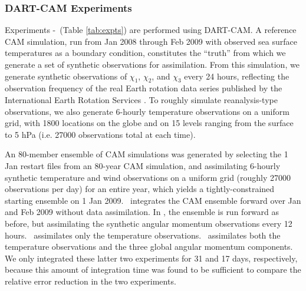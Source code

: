 

\subsubsection{DART-CAM Experiments}
Experiments \NODA-\ERPRST ~(Table \ref{tab:expts}) are performed using DART-CAM.  
A reference CAM simulation, run from Jan 2008 through Feb 2009 with observed sea surface temperatures as a boundary condition, constitutes the ``truth'' from which we generate a set of synthetic observations for assimilation. 
From this simulation, we generate synthetic observations of $\chi_1$, $\chi_2$, and $\chi_3$ every 24 hours, reflecting the observation frequency of the real Earth rotation data series published by the International Earth Rotation Services \citep{iers}.  
To roughly simulate reanalysis-type observations, we also generate 
6-hourly temperature observations on a uniform grid, with 1800 locations on the globe and on 15 levels ranging from the surface to 5 hPa (i.e. 27000 observations total at each time). 

An 80-member ensemble of CAM simulations was generated by selecting the 1 Jan restart files from an 80-year CAM simulation, and assimilating 6-hourly synthetic temperature and wind observations on a uniform grid (roughly 27000 observations per day) for an entire year, which yields a tightly-constrained starting ensemble on 1 Jan 2009.  
\NODA ~integrates the CAM ensemble forward over Jan and Feb 2009 without data assimilation. 
In \ERPALL, the ensemble is run forward as before, but assimilating the synthetic angular momentum observations every 12 hours.
\RST ~assimilates only the temperature observations.
\ERPRST ~assimilates both the temperature observations and the three global angular momentum components.
We only integrated these latter two experiments for 31 and 17 days, respectively, because this amount of integration time was found to be sufficient to compare the relative error reduction in the two experiments. 
